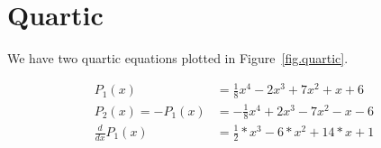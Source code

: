 \section{Quartic}
\label{sec.quartic}



We have two quartic equations plotted in Figure~\ref{fig.quartic}.


\begin{align*}
  P_1(x) &= \frac{1}{8}  x^4 -2 x^3 + 7  x^2 + x + 6\\
  P_2(x) = -P_1(x) &= -\frac{1}{8}  x^4 +2 x^3 - 7  x^2 - x - 6\\
  \frac{d}{dx} P_1(x) &= \frac{1}{2} * x^3 -6* x^2 + 14 * x + 1
\end{align*}
